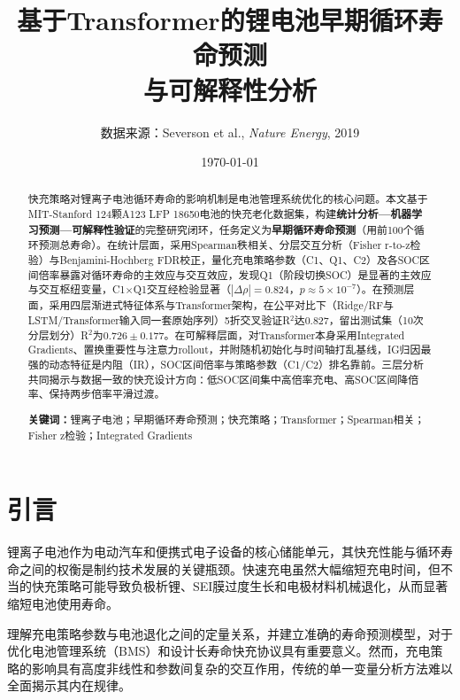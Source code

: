 \documentclass[12pt,a4paper]{ctexart}
\title{\textbf{基于Transformer的锂电池早期循环寿命预测\\与可解释性分析}}
\author{%
    \small 数据来源：Severson et al., \textit{Nature Energy}, 2019
}
\date{\today}
\begin{document}
\maketitle

\begin{abstract}
\noindent
快充策略对锂离子电池循环寿命的影响机制是电池管理系统优化的核心问题。本文基于MIT-Stanford 124颗A123 LFP 18650电池的快充老化数据集，构建\textbf{统计分析—机器学习预测—可解释性验证}的完整研究闭环，任务定义为\textbf{早期循环寿命预测}（用前100个循环预测总寿命）。在统计层面，采用Spearman秩相关、分层交互分析（Fisher r-to-z检验）与Benjamini-Hochberg FDR校正，量化充电策略参数（C1、Q1、C2）及各SOC区间倍率暴露对循环寿命的主效应与交互效应，发现Q1（阶段切换SOC）是显著的主效应与交互枢纽变量，C1$\times$Q1交互经检验显著（$|\Delta\rho|=0.824$，$p\approx5\times10^{-7}$）。在预测层面，采用四层渐进式特征体系与Transformer架构，在公平对比下（Ridge/RF与LSTM/Transformer输入同一套原始序列）5折交叉验证R$^2$达0.827，留出测试集（10次分层划分）R$^2$为$0.726\pm0.177$。在可解释层面，对Transformer本身采用Integrated Gradients、置换重要性与注意力rollout，并附随机初始化与时间轴打乱基线，IG归因最强的动态特征是内阻（IR），SOC区间倍率与策略参数（C1/C2）排名靠前。三层分析共同揭示与数据一致的快充设计方向：低SOC区间集中高倍率充电、高SOC区间降倍率、保持两步倍率平滑过渡。

\medskip
\noindent\textbf{关键词：}锂离子电池；早期循环寿命预测；快充策略；Transformer；Spearman相关；Fisher z检验；Integrated Gradients
\end{abstract}

\newpage
\tableofcontents
\newpage

\section{引言}

锂离子电池作为电动汽车和便携式电子设备的核心储能单元，其快充性能与循环寿命之间的权衡是制约技术发展的关键瓶颈。快速充电虽然大幅缩短充电时间，但不当的快充策略可能导致负极析锂、SEI膜过度生长和电极材料机械退化，从而显著缩短电池使用寿命\cite{severson2019}。

理解充电策略参数与电池退化之间的定量关系，并建立准确的寿命预测模型，对于优化电池管理系统（BMS）和设计长寿命快充协议具有重要意义。然而，充电策略的影响具有高度非线性和参数间复杂的交互作用，传统的单一变量分析方法难以全面揭示其内在规律。
\end{document}
